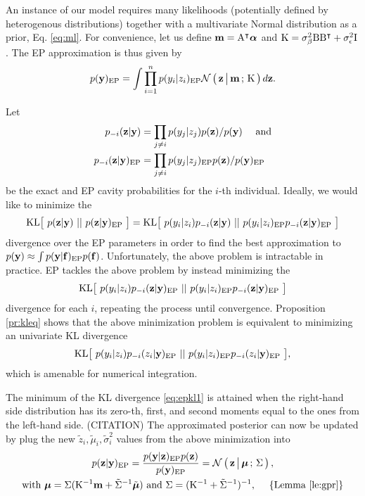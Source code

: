 An instance of our model requires many likelihoods (potentially defined by
heterogenous distributions) together with a multivariate Normal distribution
as a prior, Eq. \eqref{eq:ml}.
For convenience, let us define $\mathbf m = \mathrm A^\intercal \boldsymbol\alpha$
and $\mathrm K = \sigma^2_{\beta} \mathrm B\mathrm B^\intercal + \sigma^2_{\epsilon}
\mathrm I$.
The EP approximation is thus given by
\begin{align*}
p(\mathbf y)_{\text{EP}} = \int \prod_{i=1}^n p(y_i|z_i)_{\text{EP}}
  \mathcal{N}\left(\, { {\mathbf z} \, \big| \, {\mathbf m} } \,;\, { {\mathrm K} } \,\right) d\mathbf z.
\end{align*}

Let
\begin{align*}
    p_{-i}(\mathbf z|\mathbf y) &= \prod_{j\neq i} p(y_j|z_j) p(\mathbf z) / p(\mathbf y)
        \quad\text{ and}\\
    p_{-i}(\mathbf z|\mathbf y)_{\text{EP}} &= \prod_{j\neq i} p(y_j|z_j)_{\text{EP}} p(\mathbf z) / p(\mathbf y)_{\text{EP}}
\end{align*}
be the exact and EP cavity probabilities for the $i$-th individual.
Ideally, we would like to minimize the
\begin{align*}
    \mathrm{KL}\big[~ p(\mathbf z|\mathbf y) ~||~ p(\mathbf z|\mathbf y)_{\text{EP}} ~\big] =
      \mathrm{KL}\big[~  p(y_i|z_i) p_{-i}(\mathbf z|\mathbf y)  ~||~  p(y_i|z_i)_{\text{EP}} p_{-i}(\mathbf z|\mathbf y)_{\text{EP}}  ~\big]
\end{align*}
divergence over the EP parameters in order to find the best approximation to
$p(\mathbf y) \approx \int p(\mathbf y | \mathbf f)_{\text{EP}} p(\mathbf f)$.
Unfortunately, the above problem is intractable in practice.
EP tackles the above problem by instead minimizing the
\begin{align}\label{eq:epkl0}
\mathrm{KL}\big[~  p(y_i|z_i) p_{-i}(\mathbf z | \mathbf y)_{\text{EP}}  ~||~ 
     p(y_i|z_i)_{\text{EP}} p_{-i}(\mathbf z | \mathbf y)_{\text{EP}}  ~\big]
\end{align}
divergence for each $i$, repeating the process until convergence.
Proposition \eqref{pr:kleq} shows that the above minimization problem is
equivalent to minimizing an univariate KL divergence
\begin{align}\label{eq:epkl1}
\mathrm{KL}\big[~  p(y_i|z_i) p_{-i}(z_i | \mathbf y)_{\text{EP}}  ~||~ 
     p(y_i|z_i)_{\text{EP}} p_{-i}(z_i | \mathbf y)_{\text{EP}}  ~\big],
\end{align}
which is amenable for numerical integration.

The minimum of the KL divergence \eqref{eq:epkl1} is attained when the
right-hand side distribution has its zero-th, first, and second moments equal
to the ones from the left-hand side. (CITATION)
The approximated posterior can now be updated by plug the new
$\tilde z_i, \tilde\mu_i, \tilde\sigma^2_i$ values from the above minimization
into
\begin{gather}
  p(\mathbf z| \mathbf y)_{\text{EP}}
    = \frac{p(\mathbf y|\mathbf z)_{\text{EP}}p(\mathbf z)}{p(\mathbf y)_{\text{EP}}} =
      \mathcal{N}\left(\, { {\mathbf z} \, \big| \, {\boldsymbol\mu} } \,;\, { {\Sigma} } \,\right),\label{eq:pep}\\
        \text{with } \boldsymbol\mu = \Sigma(\mathrm K^{-1} \mathbf m
        + \tilde{\Sigma}^{-1} \tilde{\boldsymbol\mu})
    \text{ and }
    \Sigma = (\mathrm K^{-1} + \tilde{\Sigma}^{-1})^{-1},
      ~~~~ \{\text{Lemma \ref{le:gpr}}\}\nonumber
\end{gather}


